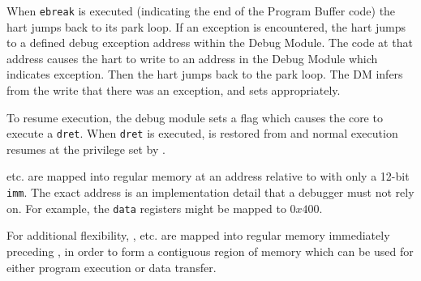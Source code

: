When {\tt ebreak} is executed (indicating the end of the
Program Buffer code) the hart jumps back to its park loop. If an exception is
encountered, the hart jumps to a defined debug exception address within
the Debug Module. The code at that address causes the hart to
write to an address in the Debug Module which indicates exception.
Then the hart jumps back to the park loop.
The DM infers from the write that there was an exception, and sets \Fcmderr appropriately.

To resume execution, the debug module sets a flag which causes the core to execute a {\tt dret}.
When {\tt dret} is executed, \Rpc is restored from \Rdpc and normal execution resumes at the
privilege set by \Fprv.

\Rdatazero etc. are mapped into regular memory at an address relative to \Rzero
with only a 12-bit {\tt imm}. The exact address is an implementation
detail that a debugger must not rely on. For example, the {\tt data}
registers might be mapped to $0x400$.

For additional flexibility, \Rprogbufzero, etc. are mapped into regular memory
immediately preceding \Rdatazero, in order to form a contiguous region of memory which
can be used for either program execution or data transfer.
